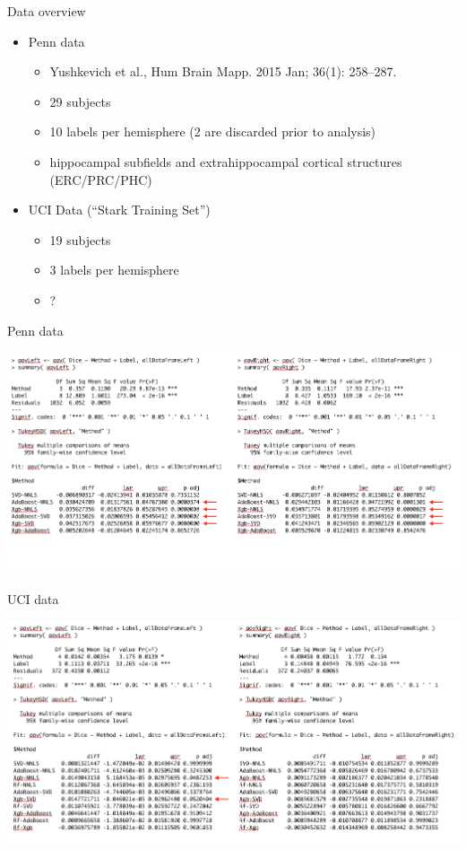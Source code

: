 \documentclass[ignorenonframetext,]{beamer}
\providecommand{\tightlist}{%
  \setlength{\itemsep}{0pt}\setlength{\parskip}{0pt}}
\begin{document}
\begin{frame}{Data overview}

\begin{itemize}
\tightlist
\item
  Penn data

  \begin{itemize}
  \tightlist
  \item
    Yushkevich et al., Hum Brain Mapp. 2015 Jan; 36(1): 258--287.
  \item
    29 subjects
  \item
    10 labels per hemisphere (2 are discarded prior to analysis)
  \item
    hippocampal subfields and extrahippocampal cortical structures
    (ERC/PRC/PHC)
  \end{itemize}
\item
  UCI Data (``Stark Training Set'')

  \begin{itemize}
  \tightlist
  \item
    19 subjects
  \item
    3 labels per hemisphere
  \item
    ?
  \end{itemize}
\end{itemize}

\end{frame}

\begin{frame}{Penn data}

\centering
\includegraphics[width=1 \textwidth]{../Figures/pennResults.png}

\end{frame}

\begin{frame}{UCI data}

\centering
\includegraphics[width=1 \textwidth]{../Figures/uciResults.png}

\end{frame}
\end{document}
